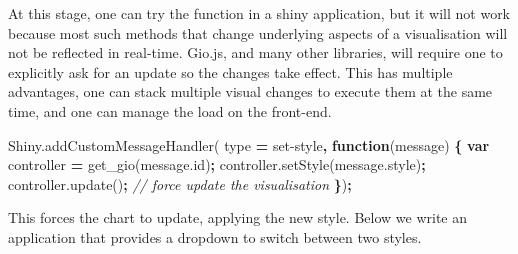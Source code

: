 \documentclass[
  10pt,
]{krantz}
\makeatletter
\newenvironment{Shaded}{\begin{snugshade}}{\end{snugshade}}
\newcommand{\AttributeTok}[1]{\textcolor[rgb]{0.61,0.61,0.61}{#1}}
\newcommand{\CommentTok}[1]{\textcolor[rgb]{0.37,0.37,0.37}{\textit{#1}}}
\newcommand{\KeywordTok}[1]{\textcolor[rgb]{0.27,0.27,0.27}{\textbf{#1}}}
\newcommand{\NormalTok}[1]{#1}
\newcommand{\OperatorTok}[1]{\textcolor[rgb]{0.43,0.43,0.43}{\textbf{#1}}}
\newcommand{\StringTok}[1]{\textcolor[rgb]{0.5,0.5,0.5}{#1}}
\newcommand{\VariableTok}[1]{\textcolor[rgb]{0,0,0}{#1}}
\newenvironment{kframe}{%
\medskip{}
\setlength{\fboxsep}{.8em}
 \def\at@end@of@kframe{}%
 \ifinner\ifhmode%
  \def\at@end@of@kframe{\end{minipage}}%
  \begin{minipage}{\columnwidth}%
 \fi\fi%
 \def\FrameCommand##1{\hskip\@totalleftmargin \hskip-\fboxsep
 \colorbox{shadecolor}{##1}\hskip-\fboxsep
     \hskip-\linewidth \hskip-\@totalleftmargin \hskip\columnwidth}%
 \MakeFramed {\advance\hsize-\width
   \@totalleftmargin\z@ \linewidth\hsize
   \@setminipage}}%
 {\par\unskip\endMakeFramed%
 \at@end@of@kframe}
\renewenvironment{Shaded}{\begin{kframe}}{\end{kframe}}
\makeatother
\begin{document}
At this stage, one can try the function in a shiny application, but it will not work because most such methods that change underlying aspects of a visualisation will not be reflected in real-time. Gio.js, and many other libraries, will require one to explicitly ask for an update so the changes take effect. This has multiple advantages, one can stack multiple visual changes to execute them at the same time, and one can manage the load on the front-end.

\begin{Shaded}
\begin{Highlighting}[]
\VariableTok{Shiny}\NormalTok{.}\AttributeTok{addCustomMessageHandler}\NormalTok{(}
\NormalTok{  type }\OperatorTok{=} \StringTok{\textquotesingle{}set{-}style\textquotesingle{}}\OperatorTok{,} \KeywordTok{function}\NormalTok{(message) }\OperatorTok{\{}
    \KeywordTok{var}\NormalTok{ controller }\OperatorTok{=} \AttributeTok{get\_gio}\NormalTok{(}\VariableTok{message}\NormalTok{.}\AttributeTok{id}\NormalTok{)}\OperatorTok{;}
    \VariableTok{controller}\NormalTok{.}\AttributeTok{setStyle}\NormalTok{(}\VariableTok{message}\NormalTok{.}\AttributeTok{style}\NormalTok{)}\OperatorTok{;}
    \VariableTok{controller}\NormalTok{.}\AttributeTok{update}\NormalTok{()}\OperatorTok{;} \CommentTok{// force update the visualisation}
\OperatorTok{\}}\NormalTok{)}\OperatorTok{;}
\end{Highlighting}
\end{Shaded}

This forces the chart to update, applying the new style. Below we write an application that provides a dropdown to switch between two styles.
\end{document}
